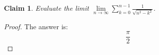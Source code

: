 \documentclass{article}
\newtheorem{theorem}{Claim}
\begin{document}
\begin{theorem}
Evaluate the limit $\lim\limits_{n\to\infty}\sum\limits_{k=0}^{n-1}\frac{1}{\sqrt{n^2-k^2}}$.
\end{theorem}

\begin{proof}
The answer is:
\[
\frac{\pi}{2}
\]
\end{proof}
\end{document}
